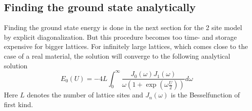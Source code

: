 \subsection{Finding the ground state analytically}
Finding the ground state energy is done in the next section for the 2 site model by explicit diagonalization. But this procedure becomes too time- and storage expensive for bigger lattices. For infinitely large lattices, which comes close to the case of a real material, the solution will converge to the following analytical solution
\begin{equation}\label{analytisch}
E_0(U)=-4L\int_{0}^{\infty}\frac{J_0(\omega)J_1(\omega)}{\omega\left( 1+\exp\left( \omega\frac{U}{2}\right) \right) }d\omega
\end{equation}\cite{lieb}
Here $ L $ denotes the number of lattice sites and $ J_n(\omega) $ is the Besselfunction of first kind.
\newline